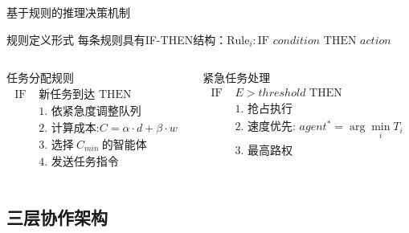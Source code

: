 \documentclass[
10pt,
aspectratio=169,
]{beamer}
\begin{document}
\begin{frame}{基于规则的推理决策机制}
    \begin{block}{规则定义形式}
        每条规则具有IF-THEN结构：$\text{Rule}_i: \text{IF } condition \text{ THEN } action$
    \end{block}
    
    \begin{columns}
        \begin{column}{0.5\textwidth}
            \begin{exampleblock}{任务分配规则}
                \begin{align}
                \text{IF } &\text{新任务到达} \text{ THEN} \\
                &\text{1. 依紧急度调整队列} \\
                &\text{2. 计算成本:} C = \alpha \cdot d + \beta \cdot w \\
                &\text{3. 选择}\ C_{min}\ \text{的智能体} \\
                &\text{4. 发送任务指令}
                \end{align}
            \end{exampleblock}
        \end{column}
        \begin{column}{0.5\textwidth}
            \begin{alertblock}{紧急任务处理}
                \begin{align}
                \text{IF } &E > threshold \text{ THEN} \\
                &\text{1. 抢占执行} \\
                &\text{2. 速度优先: } agent^* = \arg\min_i T_i \\
                &\text{3. 最高路权}
                \end{align}
            \end{alertblock}
        \end{column}
    \end{columns}
    

\end{frame}

\subsection{三层协作架构}
\end{document}
